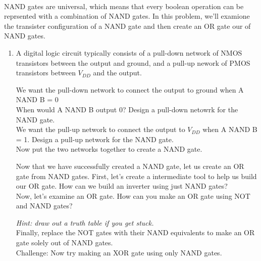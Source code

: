 
 \\
NAND gates are universal, which means that every boolean operation can be reprsented with a combination of NAND gates. In this problem, we'll examione the transister configuration of a NAND gate and then create an OR gate our of NAND gates. 

\begin{enumerate}
    \item A digital logic circuit typically consists of a pull-down network of NMOS transistors between the output and ground, and a pull-up nework of PMOS transistors between $V_{DD}$ and the output. 
    \begin{enumerate}
        \qitem We want the pull-down network to connect the output to ground when A NAND B = 0 \\
        When would A NAND B output 0? Design a pull-down netowrk for the NAND gate. \\
        \qitem We want the pull-up network to connect the output to $V_{DD}$ when A NAND B = 1.
        Design a pull-up network for the NAND gate. \\
        \sol{
        
        }
        \qitem Now put the two networks together to create a NAND gate. \\
        \sol{}
    \end{enumerate}
    Now that we have successfully created a NAND gate, let us create an OR gate from NAND gates. 
    \qitem First, let's create a intermediate tool to help us build our OR gate. How can we build an inverter using just NAND gates? \\
    \qitem Now, let's examine an OR gate. How can you make an OR gate using NOT and NAND gates?
    
    \emph{Hint: draw out a truth table if you get stuck.} \\
    \qitem Finally, replace the NOT gates with their NAND equivalents to make an OR gate solely out of NAND gates. \\
    \qitem Challenge: Now try making an XOR gate using only NAND gates. \\
\end{enumerate}
